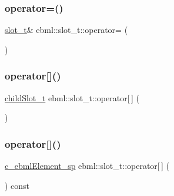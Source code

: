 \mbox{\label{classebml_1_1slot__t_a27b1914f5101516ef38491dcec55c30b}} 
\subsubsection{\texorpdfstring{operator=()}{operator=()}\hspace{0.1cm}{\footnotesize\ttfamily [6/6]}}
{\footnotesize\ttfamily \mbox{\hyperlink{classebml_1_1slot__t}{slot\+\_\+t}}\& ebml\+::slot\+\_\+t\+::operator= (\begin{DoxyParamCaption}\item[{\mbox{\hyperlink{namespaceebml_a1ddadd26791f273d851882653b9caf70}{ebml\+Element\+\_\+l}} \&\&}]{ }\end{DoxyParamCaption})}

\mbox{\label{classebml_1_1slot__t_a734f8cf3993a309a557557aca1cd6be8}} 
\subsubsection{\texorpdfstring{operator[]()}{operator[]()}\hspace{0.1cm}{\footnotesize\ttfamily [1/2]}}
{\footnotesize\ttfamily \mbox{\hyperlink{classebml_1_1childSlot__t}{child\+Slot\+\_\+t}} ebml\+::slot\+\_\+t\+::operator\mbox{[}$\,$\mbox{]} (\begin{DoxyParamCaption}\item[{size\+\_\+t}]{ }\end{DoxyParamCaption})}

\mbox{\label{classebml_1_1slot__t_a553f97004880e160551be68ab05c33ce}} 
\subsubsection{\texorpdfstring{operator[]()}{operator[]()}\hspace{0.1cm}{\footnotesize\ttfamily [2/2]}}
{\footnotesize\ttfamily \mbox{\hyperlink{namespaceebml_a2deef4e8071531b32e3533f1bf978917}{c\+\_\+ebml\+Element\+\_\+sp}} ebml\+::slot\+\_\+t\+::operator\mbox{[}$\,$\mbox{]} (\begin{DoxyParamCaption}\item[{size\+\_\+t}]{ }\end{DoxyParamCaption}) const}

